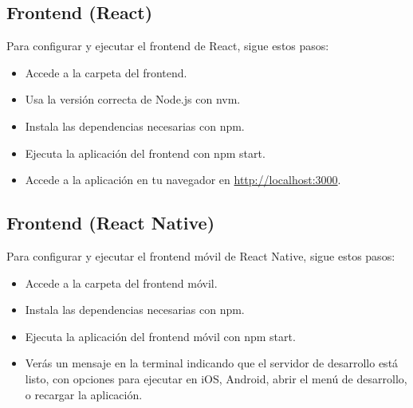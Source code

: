 \subsection{Frontend (React)}

Para configurar y ejecutar el frontend de React, sigue estos pasos:


\begin{itemize}
    \item Accede a la carpeta del frontend.
    \item Usa la versión correcta de Node.js con nvm.
    \item Instala las dependencias necesarias con npm.
    \item Ejecuta la aplicación del frontend con npm start.
    \item Accede a la aplicación en tu navegador en \url{http://localhost:3000}.
\end{itemize}

\subsection{Frontend (React Native)}

Para configurar y ejecutar el frontend móvil de React Native, sigue estos pasos:


\begin{itemize}
    \item Accede a la carpeta del frontend móvil.
    \item Instala las dependencias necesarias con npm.
    \item Ejecuta la aplicación del frontend móvil con npm start.
    \item Verás un mensaje en la terminal indicando que el servidor de desarrollo está listo, con opciones para ejecutar en iOS, Android, abrir el menú de desarrollo, o recargar la aplicación.
\end{itemize}
